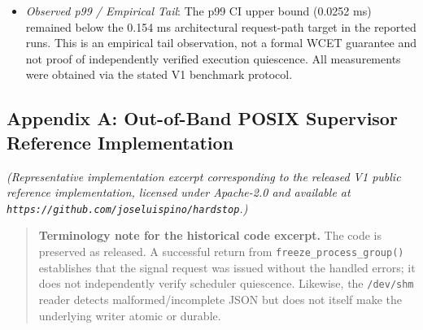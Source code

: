 \documentclass[
  10pt,letterpaper]{article}
\providecommand{\tightlist}{%
  \setlength{\itemsep}{0pt}\setlength{\parskip}{0pt}}
\begin{document}
\begin{itemize}
\begin{itemize}
    \begin{itemize}
    \tightlist
    \item
      Median: \textbf{\(0.0048\text{ ms}\)} (4.8 µs) {[}95\% CI: 0.0042,
      0.0057 ms; \(< 0.050\text{ ms}\) target{]}.
    \item
      p99: \textbf{\(0.0171\text{ ms}\)} (17.1 µs) {[}95\% CI: 0.0128,
      0.0252 ms; architectural target: \(< 0.154\text{ ms}\){]}.
    \end{itemize}
  \item
    \emph{Observed p99 / Empirical Tail}: The p99 CI upper bound
    (0.0252 ms) remained below the 0.154 ms architectural request-path target
    in the reported runs. This is an empirical tail observation, not a formal
    WCET guarantee and not proof of independently verified execution
    quiescence. All measurements were obtained via the stated V1 benchmark
    protocol.
  \end{itemize}
\end{itemize}

\subsection{Appendix A: Out-of-Band POSIX Supervisor Reference
Implementation}\label{appendix-a-out-of-band-posix-supervisor-reference-implementation}

\emph{(Representative implementation excerpt corresponding to the released
V1 public reference implementation, licensed under Apache-2.0 and available
at \texttt{https://github.com/joseluispino/hardstop}.)}

\begin{quote}
\textbf{Terminology note for the historical code excerpt.} The code is
preserved as released. A successful return from
\texttt{freeze\_process\_group()} establishes that the signal request was
issued without the handled errors; it does not independently verify scheduler
quiescence. Likewise, the \texttt{/dev/shm} reader detects
malformed/incomplete JSON but does not itself make the underlying writer
atomic or durable.
\end{quote}
\end{document}
